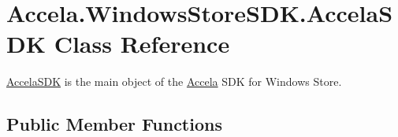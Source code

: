 \hypertarget{class_accela_1_1_windows_store_s_d_k_1_1_accela_s_d_k}{\section{Accela.\+Windows\+Store\+S\+D\+K.\+Accela\+S\+D\+K Class Reference}
\label{class_accela_1_1_windows_store_s_d_k_1_1_accela_s_d_k}
}


\hyperlink{class_accela_1_1_windows_store_s_d_k_1_1_accela_s_d_k}{Accela\+S\+D\+K} is the main object of the \hyperlink{namespace_accela}{Accela} S\+D\+K for Windows Store.  


\subsection*{Public Member Functions}
